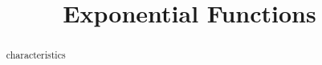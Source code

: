 \documentclass{ximera}
\title{Exponential Functions}
\begin{document}
\begin{abstract}
characteristics
\end{abstract}
\maketitle
\end{document}
